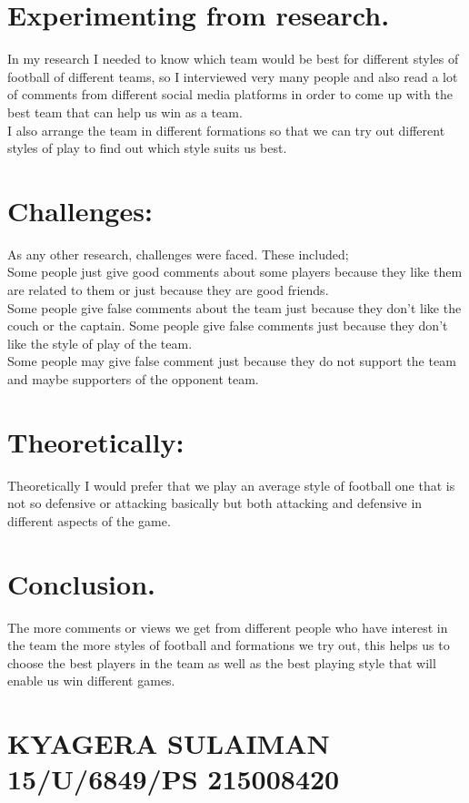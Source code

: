 \documentclass[24pt,a4paper]{article}
\begin{document}
\section{Experimenting from research.}
In my research I needed to know which team would be best for different styles of football of different teams, so I interviewed very many people and also read a lot of comments from different social media platforms in order to come up with the best team that can help us win as a team.\\
I also arrange the team in different formations so that we can try out  different styles of play to find out which style suits us best.

\section{Challenges: }
As any other research, challenges were faced. These included;\\
Some people just give good comments about some players because they like them are related to them or just because they are good friends.\\
Some people give false comments about the team just because they don’t like the couch or the captain.
Some people give false comments just because they don’t like the style of play of the team.\\
Some people may give false comment just because they do not support the team and maybe supporters of the opponent team. 

\section{Theoretically:}
Theoretically I would prefer that we play an average style of football one that is not so defensive or attacking basically but both attacking and defensive in different aspects of the game.
\section{Conclusion.}
The more comments or views we get from different people who have interest in the team the more styles of football and formations we try out, this helps us to choose the best players in the team as well as the best playing style that will enable us win different games.
\section{KYAGERA SULAIMAN   15/U/6849/PS   215008420}
\end{document}
